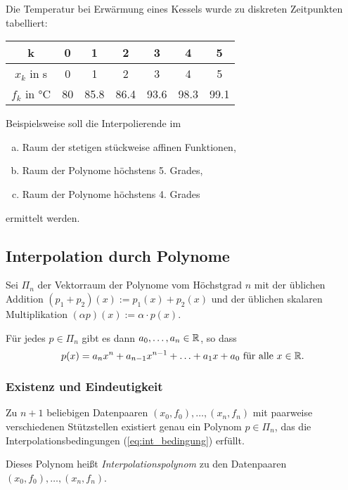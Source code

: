 \begin{exmp}
 Die Temperatur bei Erwärmung eines Kessels wurde zu diskreten Zeitpunkten tabelliert:
 
 \begin{center}
 \begin{tabular}{c|cccccc}
  k & 0 & 1 & 2 & 3 & 4 & 5\\
  \hline
  $x_k$ in \si{\s} & 0 & 1 & 2 & 3 & 4 & 5\\
  $f_k$ in \si{\celsius} & 80 & 85.8 & 86.4 & 93.6 & 98.3 & 99.1
 \end{tabular}
 \end{center}

 Beispielsweise soll die Interpolierende im
 \begin{enumerate}[a)]
  \item Raum der stetigen stückweise affinen Funktionen,
  \item Raum der Polynome höchstens 5. Grades,
  \item Raum der Polynome höchstens 4. Grades
 \end{enumerate}
 ermittelt werden.
\end{exmp}

\subsection{Interpolation durch Polynome}
Sei $\Pi_n$ der Vektorraum der Polynome vom Höchstgrad $n$ mit der üblichen Addition $(p_1+p_2)(x) := p_1(x) + p_2(x)$ und der üblichen skalaren Multiplikation $(\alpha p)(x) := \alpha \cdot p(x)$.

Für jedes $p \in \Pi_n$ gibt es dann $a_0, \ldots, a_n \in \mathbb{R}$, so dass 
\begin{equation} p(x) = a_n x^n + a_{n-1} x^{n-1} + \ldots + a_1 x + a_0 \text{ für alle } x \in \mathbb{R}. \end{equation}

\subsubsection{Existenz und Eindeutigkeit}
\begin{thm}
 Zu $n+1$ beliebigen Datenpaaren $(x_0, f_0), \ldots, (x_n, f_n)$ mit paarweise verschiedenen Stützstellen existiert genau ein Polynom $p \in \Pi_n$, das die Interpolationsbedingungen (\ref{eq:int_bedingung}) erfüllt.
\end{thm}

Dieses Polynom heißt \emph{Interpolationspolynom} zu den Datenpaaren $(x_0, f_0), \ldots, (x_n, f_n)$.

